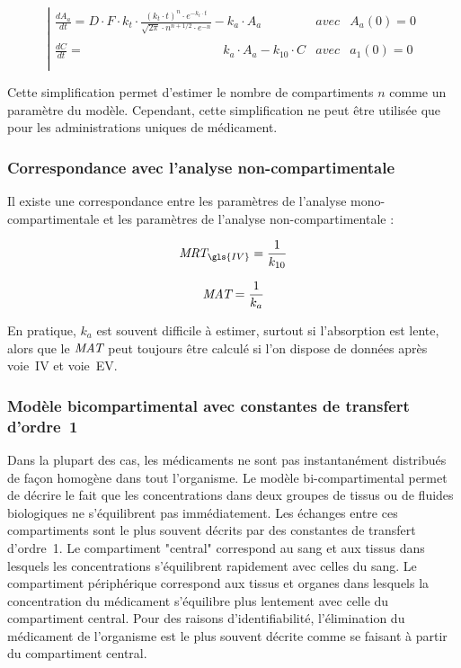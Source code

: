 \begin{equation}
\left| \begin{matrix}
\frac{dA_a}{dt}= D \cdot F \cdot k_t \cdot \frac{(k_t \cdot t)^n\cdot e^{-k_t \cdot t}}{\sqrt{2\pi}\cdot n^{n+1/2}\cdot e^{-n} } - k_a \cdot A_a                      \phantom{- k_{10}\cdot C}& avec & A_a(0)=0\\ 
\frac{dC}{dt}=\phantom{D \cdot F \cdot k_t \cdot \frac{(k_t \cdot t)^n\cdot e^{-k_t \cdot t}}{\sqrt{2\pi}\cdot n^{n+1/2}\cdot e^{-n} } - }k_a \cdot A_a             -k_{10}\cdot C & avec & a_1(0)=0\\
\end{matrix}\right.
\label{eq:21}
\end{equation}

Cette simplification permet d'estimer le nombre de compartiments $n$ comme un paramètre du modèle. Cependant, cette simplification ne peut être utilisée que pour les administrations uniques de médicament.

\subsubsection{Correspondance avec l'analyse non-compartimentale}
Il existe une correspondance entre les paramètres de l'analyse mono-compartimentale et les paramètres de l'analyse non-compartimentale :

\begin{equation}
\MRT_{\gls{IV}} = \frac{1}{k_{10}}
\label{eq:22}
\end{equation}


\begin{equation}
\operatorname{\textit{MAT}} = \frac{1}{k_a}
\label{eq:23}
\end{equation}

En pratique, $k_a$ est souvent difficile à estimer, surtout si l'absorption est lente, alors que le $\operatorname{\textit{MAT}}$ peut toujours être calculé si l'on dispose de données après voie~\gls{IV} et voie~\gls{EV}.

\subsubsection{Modèle bicompartimental avec constantes de transfert d'ordre~1}
Dans la plupart des cas, les médicaments ne sont pas instantanément distribués de façon homogène dans tout l'organisme. Le modèle bi-compartimental permet de décrire le fait que les concentrations dans deux groupes de tissus ou de fluides biologiques ne s'équilibrent pas immédiatement. Les échanges entre ces compartiments sont le plus souvent décrits par des constantes de transfert d'ordre~1. Le compartiment "central" correspond au sang et aux tissus dans lesquels les concentrations s'équilibrent rapidement avec celles du sang. Le compartiment périphérique correspond aux tissus et organes dans lesquels la concentration du médicament s'équilibre plus lentement avec celle du compartiment central. Pour des raisons d'identifiabilité, l'élimination du médicament de l'organisme est le plus souvent décrite comme se faisant à partir du compartiment central.

